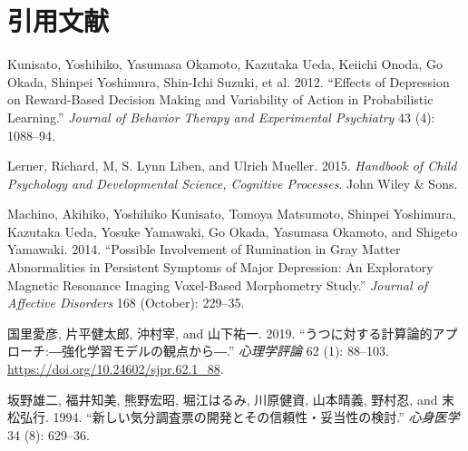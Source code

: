 \documentclass[11pt,a4paper,xelatex,ja=standard]{bxjsarticle}
\newenvironment{Shaded}{\begin{snugshade}}{\end{snugshade}}
\newcommand{\CharTok}[1]{\textcolor[rgb]{0.31,0.60,0.02}{#1}}
\newcommand{\DataTypeTok}[1]{\textcolor[rgb]{0.13,0.29,0.53}{#1}}
\newcommand{\KeywordTok}[1]{\textcolor[rgb]{0.13,0.29,0.53}{\textbf{#1}}}
\newcommand{\NormalTok}[1]{#1}
\newcommand{\OperatorTok}[1]{\textcolor[rgb]{0.81,0.36,0.00}{\textbf{#1}}}
\newcommand{\StringTok}[1]{\textcolor[rgb]{0.31,0.60,0.02}{#1}}
\begin{document}
\hypertarget{ux5f15ux7528ux6587ux732e}{%
\section{引用文献}\label{ux5f15ux7528ux6587ux732e}}

\hypertarget{refs}{}
\leavevmode\hypertarget{ref-Kunisato2012}{}%
Kunisato, Yoshihiko, Yasumasa Okamoto, Kazutaka Ueda, Keiichi Onoda, Go
Okada, Shinpei Yoshimura, Shin-Ichi Suzuki, et al. 2012. ``Effects of
Depression on Reward-Based Decision Making and Variability of Action in
Probabilistic Learning.'' \emph{Journal of Behavior Therapy and
Experimental Psychiatry} 43 (4): 1088--94.

\leavevmode\hypertarget{ref-lerner2015handbook}{}%
Lerner, Richard, M, S. Lynn Liben, and Ulrich Mueller. 2015.
\emph{Handbook of Child Psychology and Developmental Science, Cognitive
Processes}. John Wiley \& Sons.

\leavevmode\hypertarget{ref-Machino2014}{}%
Machino, Akihiko, Yoshihiko Kunisato, Tomoya Matsumoto, Shinpei
Yoshimura, Kazutaka Ueda, Yosuke Yamawaki, Go Okada, Yasumasa Okamoto,
and Shigeto Yamawaki. 2014. ``Possible Involvement of Rumination in Gray
Matter Abnormalities in Persistent Symptoms of Major Depression: An
Exploratory Magnetic Resonance Imaging Voxel-Based Morphometry Study.''
\emph{Journal of Affective Disorders} 168 (October): 229--35.

\leavevmode\hypertarget{ref-kunisato2019}{}%
国里愛彦, 片平健太郎, 沖村宰, and 山下祐一. 2019.
``うつに対する計算論的アプローチ:―強化学習モデルの観点から―.''
\emph{心理学評論} 62 (1): 88--103.
\url{https://doi.org/10.24602/sjpr.62.1_88}.

\leavevmode\hypertarget{ref-ux5742ux91ceux96c4ux4e8c1994}{}%
坂野雄二, 福井知美, 熊野宏昭, 堀江はるみ, 川原健資, 山本晴義, 野村忍,
and 末松弘行. 1994.
``新しい気分調査票の開発とその信頼性・妥当性の検討.'' \emph{心身医学} 34
(8): 629--36.

\begin{Shaded}
\end{Shaded}
\end{document}
